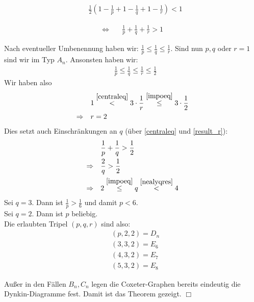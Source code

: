 \documentclass[a4paper,12pt]{article}
\begin{document}
\begin{enumerate}
\begin{align*}
&\frac{1}{2} \left(  1-\frac{1}{p} + 1-\frac{1}{q} + 1-\frac{1}{r}   \right) <1
\end{align*}
\begin{framed}
\begin{align}
\Leftrightarrow \quad & \frac{1}{p} + \frac{1}{q} + \frac{1}{r} >1 \label{centraleq}
\end{align}
\end{framed}
Nach eventueller Umbenennung haben wir: $\frac{1}{p} \leq \frac{1}{q} \leq \frac{1}{r}$. Sind nun $p, q$ oder $r =1$ sind wir im Typ $A_n$. Ansonsten haben wir:
\begin{align}
& \frac{1}{p} \leq \frac{1}{q} \leq \frac{1}{r} \leq \frac{1}{2} \label{impoeq} 
\end{align}
Wir haben also 
\begin{align}
& 1\overset{\eqref{centraleq}}{<} 3\cdot \frac{1}{r} \overset{ \eqref{impoeq}}{\leq} 3\cdot\frac{1}{2	} \notag\\
\Rightarrow \quad & r=2\label{result_r}
\end{align}
Dies setzt auch Einschränkungen an $q$ (über \eqref{centraleq} und  \eqref{result_r}):
\begin{align}
&\frac{1}{p} + \frac{1}{q} >\frac{1}{2}\notag\\
\Rightarrow \quad & \frac{2}{q} > \frac{1}{2} \label{nealyqres} \\
\Rightarrow \quad & 2 \overset{\eqref{impoeq}}{\leq} q \overset{\eqref{nealyqres}}{<} 4\notag
\end{align}
Sei $q=3$. Dann ist $\frac{1}{p} >\frac{1}{6}$ und damit $p<6$.\\
Sei $q=2$. Dann ist $p$ beliebig.\\
Die erlaubten Tripel $(p,q,r)$ sind also: 
\begin{align*}
& (p,2,2) = D_n\\
& (3,3,2) = E_6\\
& (4,3,2) = E_7\\
& (5,3,2) = E_8
\end{align*}
\end{enumerate}

Außer in den Fällen $B_n, C_n$ legen die Coxeter-Graphen bereits eindeutig die Dynkin-Diagramme fest. Damit ist das Theorem gezeigt.
\hfill $\Box$\\
\end{document}
